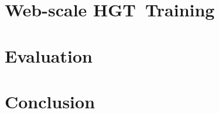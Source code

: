 \documentclass[sigconf]{acmart}
\theoremstyle{definition}
\newcommand{\short}{HGT}
\begin{document}
\section{Web-scale \short\ Training}\label{sec:train}

    
\section{Evaluation}\label{sec:evaluation}





\section{Conclusion}\label{sec:conclusion}


\balance




\end{document}
